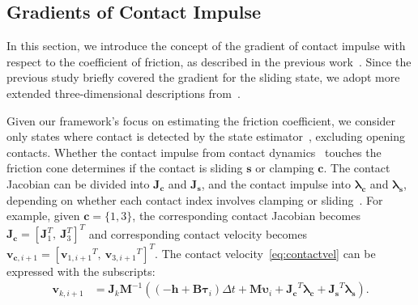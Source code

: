 \subsection{Gradients of Contact Impulse}
In this section, we introduce the concept of the gradient of contact impulse with respect to the coefficient of friction, as described in the previous work~\cite{werling2021fast}.  Since the previous study briefly covered the gradient for the sliding state, we adopt more extended three-dimensional descriptions from~\cite{kim2023contactimplicit}. 

Given our framework's focus on estimating the friction coefficient, we consider only states where contact is detected by the state estimator~\cite{Joonha2023TRO}, excluding opening contacts. Whether the contact impulse from contact dynamics~\cite{raisim} touches the friction cone determines if the contact is sliding $\mathbf{s}$ or clamping $\mathbf{c}$. The contact Jacobian can be divided into $\mathbf{J}_\mathbf{c}$ and $\mathbf{J}_\mathbf{s}$, and the contact impulse into $\bm{\lambda}_\mathbf{c}$ and $\bm{\lambda}_\mathbf{s}$, depending on whether each contact index involves clamping or sliding~\cite{werling2021fast}.  For example, given $\mathbf{c}=\{1,3\}$, the corresponding contact Jacobian becomes $\mathbf{J}_{\mathbf{c}}=\left[\mathbf{J}_1^T,~\mathbf{J}_3^T\right]^T$ and corresponding contact velocity becomes $\mathbf{v}_{\mathbf{c},i+1}=\left[{\mathbf{v}_{1,i+1}}^T,~{\mathbf{v}_{3,i+1}}^T\right]^T$. The contact velocity~\eqref{eq:contactvel} can be expressed with the subscripts:
 \begin{align}
\label{eq:next_state_clamping}
\textbf{v}_{k,i+1}\nonumber&=\mathbf{J}_{k}\mathbf{M}^{-1}((-\mathbf{h}+\mathbf{B} \boldsymbol{\tau}_i)\Delta t+\mathbf{M}\boldsymbol{\upsilon}_i+{\mathbf{J}_\mathbf{c}}^T \bm{\lambda}_{\mathbf{c}}+{\mathbf{J}_\mathbf{s}}^T \bm{\lambda}_{\mathbf{s}}).
\end{align}

